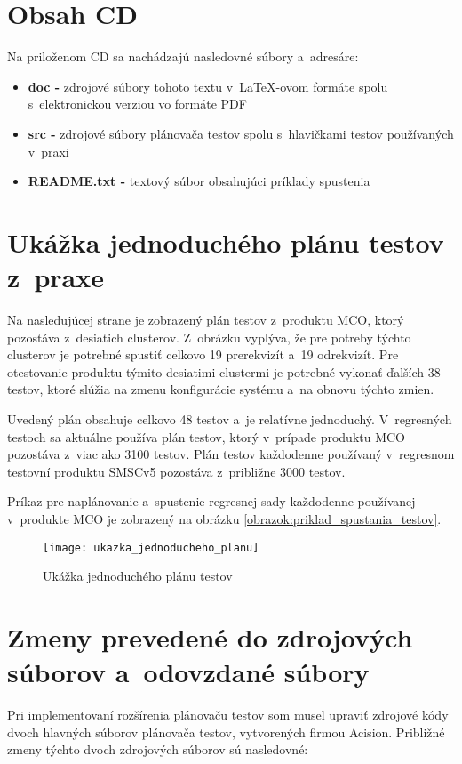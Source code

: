 %
%
\chapter{Obsah CD}
Na priloženom CD sa nachádzajú nasledovné súbory a~adresáre:
\begin{itemize}
\item \textbf{doc -} zdrojové súbory tohoto textu v~\LaTeX-ovom formáte 
spolu s~elektronickou verziou vo formáte PDF
\item \textbf{src -} zdrojové súbory plánovača testov spolu s~hlavičkami 
testov používaných v~praxi
\item \textbf{README.txt -} textový súbor obsahujúci príklady spustenia
\end{itemize}



%
%
\chapter{Ukážka jednoduchého plánu testov z~praxe}
\label{priloha:jednoduchy_plan_testov}
Na nasledujúcej strane je zobrazený plán testov z~produktu MCO,
ktorý pozostáva z~desiatich clusterov. Z~obrázku vyplýva, že pre potreby
týchto clusterov je potrebné spustiť celkovo 19 prerekvizít a~19 
odrekvizít. Pre otestovanie produktu týmito desiatimi clustermi je 
potrebné vykonať ďalších 38 testov, ktoré slúžia na zmenu konfigurácie
systému a~na obnovu týchto zmien. 

Uvedený plán obsahuje celkovo 48 testov a~je relatívne jednoduchý.
V~regresných testoch sa aktuálne používa plán testov, ktorý v~prípade 
produktu MCO pozostáva z~viac ako 3100 testov.
Plán testov každodenne používaný v~regresnom testovní produktu SMSCv5 
pozostáva z~približne 3000 testov.

Príkaz pre naplánovanie a~spustenie regresnej sady každodenne 
používanej v~produkte MCO je zobrazený na obrázku 
\ref{obrazok:priklad_spustania_testov}.

\begin{figure}[h]
  \texttt{[image: ukazka\_jednoducheho\_planu]}
  \caption{Ukážka jednoduchého plánu testov}
\end{figure}



%
%
\chapter{Zmeny prevedené do zdrojových súborov a~odovzdané súbory}
\label{priloha:zmeny_do_zdrojakov}
Pri implementovaní rozšírenia plánovaču testov som musel upraviť zdrojové
kódy dvoch hlavných súborov plánovača testov, vytvorených firmou Acision.
Približné zmeny týchto dvoch zdrojových súborov sú nasledovné:

